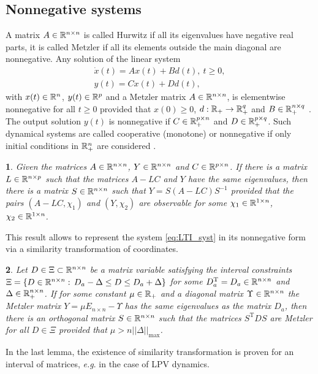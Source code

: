 \documentclass[letterpaper, 10 pt, conference]{ieeeconf}
\theoremstyle{plain}
\newtheorem{lem}{\protect\lemmaname}
\theoremstyle{definition}
\theoremstyle{plain}
\theoremstyle{plain}
\theoremstyle{remark}
\providecommand{\lemmaname}{Lemma}
\begin{document}
\subsection{Nonnegative systems}

A matrix $A\in\mathbb{R}^{n\times n}$ is called Hurwitz if all its eigenvalues have negative real parts, it is called Metzler if all its elements outside the main diagonal are nonnegative. Any solution of the linear system
\begin{gather}
\dot{x}(t)=Ax(t)+Bd(t),\:t\geq0,\label{eq:LTI_syst}\\
y(t)=Cx(t)+Dd(t),\nonumber 
\end{gather}
with $x(t)\in\mathbb{R}^{n}$, $y(t)\in\mathbb{R}^{p}$ and a Metzler matrix $A\in\mathbb{R}^{n\times n}$, is elementwise nonnegative for all $t\ge0$ provided that $x(0)\ge0$, $d:\mathbb{R}_{+}\to\mathbb{R}_{+}^{q}$ and $B\in\mathbb{R}_{+}^{n\times q}$ \cite{FarinaRinaldi2000,Smith95}. The output solution $y(t)$ is nonnegative if $C\in\mathbb{R}_{+}^{p\times n}$ and $D\in\mathbb{R}_{+}^{p\times q}$. Such dynamical systems are called cooperative (monotone) or nonnegative if only initial conditions in $\mathbb{R}_{+}^{n}$ are considered \cite{FarinaRinaldi2000,Smith95}.
\begin{lem}
\label{lem:l2}\textup{\cite{REZ11}} Given the matrices $A\in\mathbb{R}^{n\times n}$, $Y\in\mathbb{R}^{n\times n}$ and \textup{$C\in\mathbb{R}^{p\times n}$. }If there is a matrix \textup{$L\in\mathbb{R}^{n\times p}$} such that the matrices $A-LC$ and $Y$ have the same eigenvalues, then there is a matrix $S\in\mathbb{R}^{n\times n}$ such that $Y=S(A-LC)S^{-1}$ provided that the pairs $(A-LC,\chi_{1})$ and $(Y,\chi_{2})$ are observable for some $\chi_{1}\in\mathbb{R}^{1\times n}$, $\chi_{2}\in\mathbb{R}^{1\times n}$.\textup{ }
\end{lem}
This result allows to represent the system \eqref{eq:LTI_syst} in its nonnegative form via a similarity transformation of coordinates.
\begin{lem}
\label{lem:l3}\textup{\cite{Efimov_a2013}} Let $D\in\Xi\subset\mathbb{R}^{n\times n}$ be a matrix variable satisfying the interval constraints $\Xi=\{D\in\mathbb{R}^{n\times n}:\,D_{a}-\Delta\le D\le D_{a}+\Delta\}$ for some $D_{a}^{\text{T}}=D_{a}\in\mathbb{R}^{n\times n}$ and $\Delta\in\mathbb{R}_{+}^{n\times n}$. If for some constant $\mu\in\mathbb{R}_{+}$ and a diagonal matrix $\Upsilon\in\mathbb{R}^{n\times n}$ the Metzler matrix $Y=\mu E_{n\times n}-\Upsilon$ has the same eigenvalues as the matrix $D_{a}$, then there is an orthogonal matrix $S\in\mathbb{R}^{n\times n}$ such that the matrices $S^{\text{T}}DS$ are Metzler for all $D\in\Xi$ provided that $\mu>n||\Delta||_{\max}$.\textup{ }
\end{lem}
In the last lemma, the existence of similarity transformation is proven for an interval of matrices, \emph{e.g}. in the case of LPV dynamics.
\end{document}
